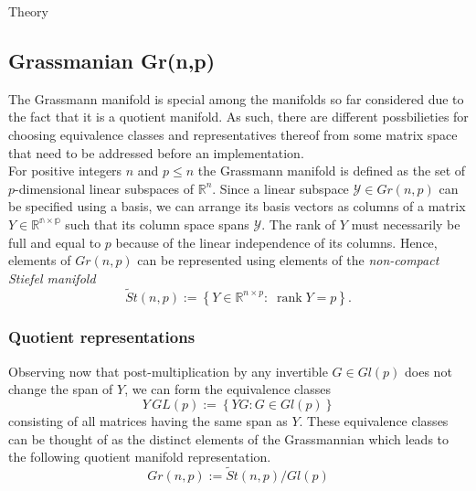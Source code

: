 \begin{chapter}{Theory}


\subsection{Grassmanian Gr(n,p)} %
\label{sub:Grassmanian}
The Grassmann manifold is special among the manifolds so far considered due to the fact that it is a quotient manifold. 
As such, there are different possbilieties for choosing equivalence classes and representatives thereof from some matrix space that need to be addressed
before an implementation.\\

For positive integers $n$ and $p\leq n$ the Grassmann manifold is defined as the set of $p$-dimensional linear subspaces of $\mathbb{R}^n$. 
Since a linear subspace $\mathcal{Y}\in Gr(n,p)$ can be specified using a basis, we can arrange its basis vectors as columns of
a matrix $Y\in\mathbb{R^{n\times p}}$ such that its column space spans $\mathcal{Y}$. The rank of $Y$ must necessarily be full and equal to $p$ because of the linear independence
of its columns. Hence, elements of $Gr(n,p)$ can be represented using elements of the \emph{non-compact Stiefel manifold}
\begin{equation}
    \tilde St(n,p) := \left\lbrace Y\in\mathbb{R}^{n\times p}:\; \operatorname{rank}Y=p\right\rbrace.
\end{equation}

\subsubsection{Quotient representations} %
\label{ssub:Quotient representations}
Observing now that post-multiplication by any invertible $G\in Gl(p)$ does not change the span of $Y$, we can form the equivalence classes
\begin{equation}
    Y\,GL(p) := \left\lbrace YG: G\in Gl(p)\right\rbrace
\end{equation}
consisting of all matrices having the same span as $Y$. These equivalence classes can be thought of as the distinct elements of the Grassmannian which
leads to the following quotient manifold representation.\\
\begin{equation}
    Gr(n,p):=\tilde St(n,p) / Gl(p)
\end{equation}


\end{chapter}
